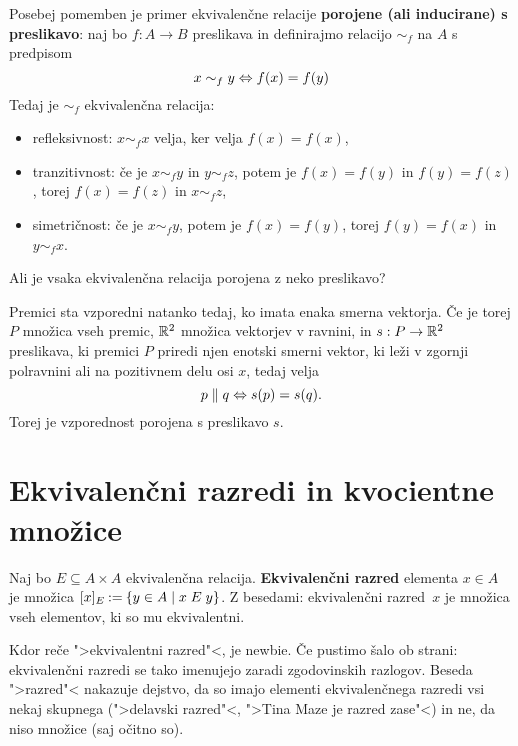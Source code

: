 Posebej pomemben je primer ekvivalenčne relacije \textbf{porojene (ali inducirane) s preslikavo}:
naj bo $f : A \to B$ preslikava in definirajmo relacijo $\sim_f$ na $A$ s predpisom
%
\begin{equation*}
  x \sim_f y \Leftrightarrow f(x) = f(y)
\end{equation*}
%
Tedaj je $\sim_f$ ekvivalenčna relacija:
%
\begin{itemize}
\item refleksivnost: $x \sim_f x$ velja, ker velja $f(x) = f(x)$,
\item tranzitivnost: če je $x \sim_f y$ in $y \sim_f z$, potem je $f(x) = f(y)$ in $f(y) = f(z)$, torej $f(x) = f(z)$ in $x \sim_f z$,
\item simetričnost: če je $x \sim_f y$, potem je $f(x) = f(y)$, torej $f(y) = f(x)$ in $y \sim_f x$.
\end{itemize}
%
Ali je vsaka ekvivalenčna relacija porojena z neko preslikavo?

\begin{primer}
  Premici sta vzporedni natanko tedaj, ko imata enaka smerna vektorja. Če je
  torej $P$ množica vseh premic, $\mathbb{R}^2$ množica vektorjev v ravnini, in $s : P \to \mathbb{R}^2$
  preslikava, ki premici $P$ priredi njen enotski smerni vektor, ki leži v zgornji polravnini ali
  na pozitivnem delu osi $x$, tedaj velja
  \begin{equation*}
    p \parallel q \Leftrightarrow s(p) = s(q).
  \end{equation*}
  Torej je vzporednost porojena s preslikavo $s$.
\end{primer}

\section{Ekvivalenčni razredi in kvocientne množice}

\begin{definicija}
  Naj bo $E \subseteq A \times A$ ekvivalenčna relacija. \textbf{Ekvivalenčni razred} elementa $x \in A$ je množica
  $[x]_E \mathbin{{:}{=}} \left\{ y \in A \; \middle| \; x \mathrel{E} y \right\}$. Z besedami: ekvivalenčni razred~$x$ je množica vseh elementov, ki so mu
  ekvivalentni.
\end{definicija}

\begin{opomba}
  Kdor reče ">ekvivalentni razred"<, je newbie.
  Če pustimo šalo ob strani: ekvivalenčni razredi se tako imenujejo zaradi zgodovinskih razlogov. Beseda ">razred"< nakazuje dejstvo, da so imajo elementi ekvivalenčnega razredi vsi nekaj skupnega (">delavski razred"<, ">Tina Maze je razred zase"<) in ne, da niso množice (saj očitno so).
\end{opomba}

